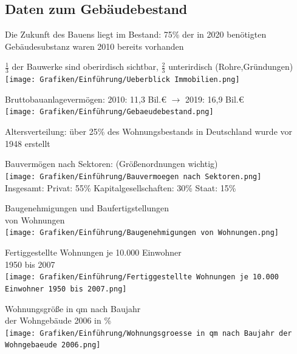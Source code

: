 \documentclass[fleqn,twoside,dvipsnames]{article}
\begin{document}
    \subsection{Daten zum Gebäudebestand} 
        \begin{itemize}
            \item Die Zukunft des Bauens liegt im Bestand: 75\% der in 2020 benötigten Gebäudesubstanz waren 2010 bereits vorhanden
                \item $\frac13$ der Bauwerke sind oberirdisch sichtbar, $\frac23$ unterirdisch (Rohre,Gründungen)\\
                        \texttt{[image: Grafiken/Einführung/Ueberblick Immobilien.png]}
                \item Bruttobauanlagevermögen: 2010: 11,3 Bil.€ $\rightarrow$ 2019: 16,9 Bil.€\\
                        \texttt{[image: Grafiken/Einführung/Gebaeudebestand.png]}
                \item Altersverteilung: über 25\% des Wohnungsbestands in Deutschland wurde vor 1948 erstellt
                \item Bauvermögen nach Sektoren: (Größenordnungen wichtig) \label{Bauvermögen}\\
                        \texttt{[image: Grafiken/Einführung/Bauvermoegen nach Sektoren.png]}\\
                        Insgesamt: Privat: 55\% Kapitalgesellschaften: 30\% Staat: 15\%\\
            \begin{minipage}{0.5\textwidth}
                \item Baugenehmigungen und Baufertigstellungen \\von Wohnungen\\
                        \texttt{[image: Grafiken/Einführung/Baugenehmigungen von Wohnungen.png]}
                \item Fertiggestellte Wohnungen je 10.000 Einwohner \\1950 bis 2007\\
                        \texttt{[image: Grafiken/Einführung/Fertiggestellte Wohnungen je 10.000 Einwohner 1950 bis 2007.png]}
                \item Wohnungsgröße in qm nach Baujahr\\ der Wohngebäude 2006 in \%\\
                        \texttt{[image: Grafiken/Einführung/Wohnungsgroesse in qm nach Baujahr der Wohngebaeude 2006.png]}

\end{minipage}
\end{itemize}
\end{document}

